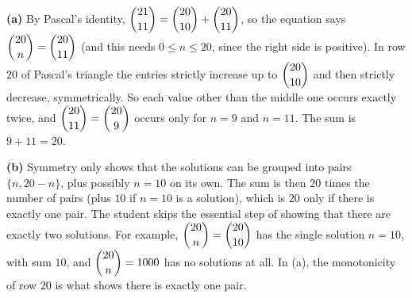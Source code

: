\textbf{(a)} By Pascal's identity, $\dbinom{21}{11}=\dbinom{20}{10}+\dbinom{20}{11}$, so the equation says $\dbinom{20}{n}=\dbinom{20}{11}$ (and this needs $0\le n\le20$, since the right side is positive). In row $20$ of Pascal's triangle the entries strictly increase up to $\dbinom{20}{10}$ and then strictly decrease, symmetrically. So each value other than the middle one occurs exactly twice, and $\dbinom{20}{11}=\dbinom{20}{9}$ occurs only for $n=9$ and $n=11$. The sum is $9+11=\boxed{20}$.

\textbf{(b)} Symmetry only shows that the solutions can be grouped into pairs $\{n,20-n\}$, plus possibly $n=10$ on its own. The sum is then $20$ times the number of pairs (plus $10$ if $n=10$ is a solution), which is $20$ only if there is exactly one pair. The student skips the essential step of showing that there are exactly two solutions. For example, $\dbinom{20}{n}=\dbinom{20}{10}$ has the single solution $n=10$, with sum $10$, and $\dbinom{20}{n}=1000$ has no solutions at all. In (a), the monotonicity of row $20$ is what shows there is exactly one pair.

